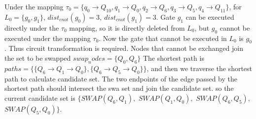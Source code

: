 \documentclass[runningheads]{llncs}
\begin{document}
\begin{example}
	Under the mapping $\tau_{0}=\{q_{0}\rightarrow  Q_{10},q_{1}\rightarrow Q_{0},
q_{2}\rightarrow  Q_{6},q_{3}\rightarrow  Q_{5},q_{4}\rightarrow  Q_{11}\}$, 
for $L_{0}=\{g_{0},g_{1}\}$, $dist_{cnot}(g_{0})=3,\ dist_{cnot}(g_{1})=3$. 
Gate $g_{1}$ can be executed directly under the $\tau_{0}$ mapping, so it is directly deleted from $L_{0}$,
but $g_{0}$ cannot be executed under the mapping $\tau_{0}$. 
Now the gate that cannot be executed in $L_{0}$ is $g_{0}$. 
Thus circuit transformation is required. 
Nodes that cannot be exchanged join the set to be swapped $swap_nodes=\{Q_{0},Q_6\}$
The shortest path is $paths=\{\{Q_{6}\rightarrow Q_{1} \rightarrow Q_{0} \},\{Q_{6}\rightarrow Q_{5} \rightarrow Q_{0} \}\}$, 
and then we traverse the shortest path to calculate candidate set.
The two endpoints of the edge passed by the shortest path should intersect the swa set and join the candidate set.
so the current candidate set is $\{SWAP(Q_{6},Q_{1}),$ $SWAP(Q_{1},Q_{0}),$ $SWAP(Q_{6},Q_{5}),$ $SWAP(Q_{5},Q_{0}) \}$.
\end{example}
\end{document}
